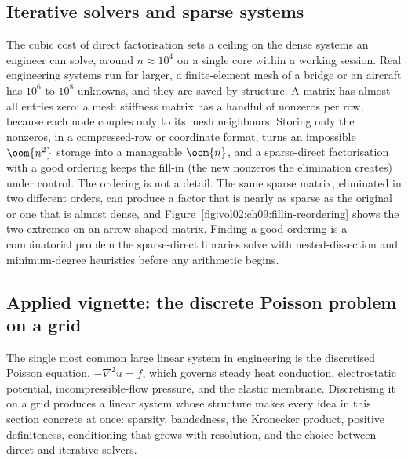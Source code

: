 \subsection{Iterative solvers and sparse systems}

The cubic cost of direct factorisation sets a ceiling on the dense
systems an engineer can solve, around $n \approx 10^{4}$ on a single
core within a working session. Real engineering systems run far
larger, a finite-element mesh of a bridge or an aircraft has $10^{6}$
to $10^{8}$ unknowns, and they are saved by structure. A
 matrix has almost all entries zero; a mesh stiffness
matrix has a handful of nonzeros per row, because each node couples
only to its mesh neighbours. Storing only the nonzeros, in a
compressed-row or coordinate format, turns an impossible $\oom{n^{2}}$
storage into a manageable $\oom{n}$, and a sparse-direct
factorisation with a good ordering keeps the fill-in (the new
nonzeros the elimination creates) under control. The ordering is not a
detail. The same sparse matrix, eliminated in two different orders, can
produce a factor that is nearly as sparse as the original or one that is
almost dense, and Figure~\ref{fig:vol02:ch09:fillin-reordering} shows
the two extremes on an arrow-shaped matrix. Finding a good ordering is a
combinatorial problem the sparse-direct libraries solve with
nested-dissection and minimum-degree heuristics before any arithmetic
begins.



\subsection{Applied vignette: the discrete Poisson problem on a grid}

The single most common large linear system in engineering is the
discretised Poisson equation, $-\nabla^{2}u = f$, which governs steady
heat conduction, electrostatic potential, incompressible-flow pressure,
and the elastic membrane. Discretising it on a grid produces a linear
system whose structure makes every idea in this section concrete at
once: sparsity, bandedness, the Kronecker product, positive
definiteness, conditioning that grows with resolution, and the choice
between direct and iterative solvers.


